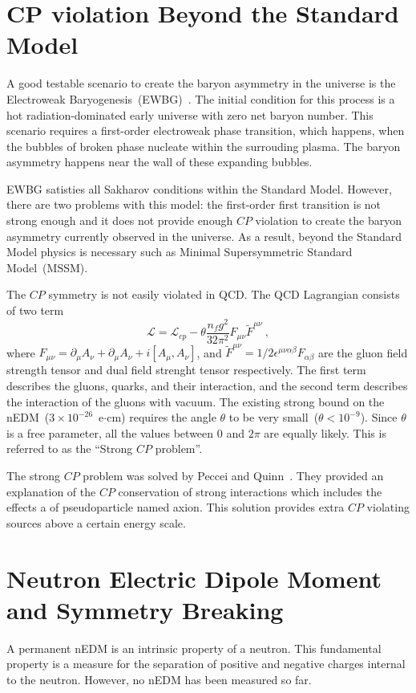 \section{CP violation Beyond the Standard Model}
A good testable scenario to create the baryon asymmetry in the
universe is the Electroweak
Baryogenesis~(EWBG)~\cite{Morrissey2012}. The initial condition for
this process is a hot radiation-dominated early universe with zero net
baryon number. This scenario requires a first-order electroweak phase
transition, which happens, when the bubbles of broken phase nucleate
within the surrouding plasma. The baryon asymmetry happens near the
wall of these expanding bubbles.

EWBG satisties all Sakharov conditions within the Standard
Model. However, there are two problems with this model: the
first-order first transition is not strong enough and it does not
provide enough $CP$ violation to create the baryon asymmetry currently
observed in the universe. As a result, beyond the Standard Model
physics is necessary such as Minimal Supersymmetric Standard
Model~(MSSM).

The $CP$ symmetry is not easily violated in QCD. The QCD Lagrangian consists of two term
\begin{equation}
  \label{eqn:qcd}
\mathscr{L}= \mathscr{L}_{cp} - \theta \frac{n_f g^2}{32 \pi^2} F_{\mu \nu} \tilde{F}^{\mu \nu}~,
\end{equation}
where
$F_{\mu \nu} = \partial_\mu A_\nu + \partial_\mu A_\nu +
i[A_\mu,A_\nu]$, and
$\tilde{F}^{\mu \nu}=1/2 \epsilon^{\mu \nu \alpha \beta}F_{\alpha
  \beta}$ are the gluon field strength tensor and dual field strenght
tensor respectively. The first term describes the gluons, quarks, and
their interaction, and the second term describes the interaction of
the gluons with vacuum. The existing strong bound on the
nEDM~($3 \times 10^{-26}$~e$\cdot$cm) requires the angle $\theta$ to
be very small~($\theta < 10^{-9}$). Since $\theta$ is a free
parameter, all the values between 0 and $2\pi$ are equally
likely. This is referred to as the ``Strong $CP$ problem''.

The strong $CP$ problem was solved by Peccei and
Quinn~\cite{Peccei1977}. They provided an explanation of the $CP$
conservation of strong interactions which includes the effects a of
pseudoparticle named axion. This solution provides extra $CP$
violating sources above a certain energy scale.

\section{Neutron Electric Dipole Moment and Symmetry Breaking}
A permanent nEDM is an intrinsic property of a neutron. This
fundamental property is a measure for the separation of positive and
negative charges internal to the neutron. However, no nEDM has been
measured so far.


